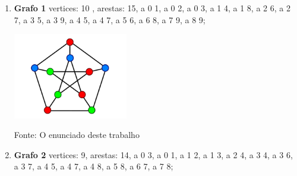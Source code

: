 \documentclass[12pt,openright,oneside,a4paper,brazil]{abntex2}
\begin{document}
\begin{enumerate}
	\item 	\textbf{Grafo 1} \newline
		vertices: 10 , arestas: 15, \newline
		a 0 1, \newline
		a 0 2, \newline
		a 0 3, \newline
		a 1 4, \newline
		a 1 8, \newline
		a 2 6, \newline
		a 2 7, \newline
		a 3 5, \newline
		a 3 9, \newline
		a 4 5, \newline
		a 4 7, \newline
		a 5 6, \newline
		a 6 8, \newline
		a 7 9, \newline
		a 8 9;
		
		\includegraphics[width=5cm]{grafo1.png}

		
		Fonte: O enunciado deste trabalho
	\item \textbf{Grafo 2} \newline 
		vertices: 9, arestas: 14, \newline
		a 0 3, \newline
		a 0 1, \newline
		a 1 2, \newline
		a 1 3, \newline
		a 2 4, \newline
		a 3 4, \newline
		a 3 6, \newline
		a 3 7, \newline
		a 4 5, \newline
		a 4 7, \newline
		a 4 8, \newline
		a 5 8, \newline
		a 6 7, \newline
		a 7 8;
		

\end{enumerate}
\end{document}
